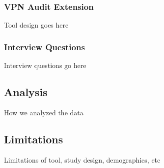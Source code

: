 \subsubsection{VPN Audit Extension}
Tool design goes here

\subsubsection{Interview Questions}
Interview questions go here

\subsection{Analysis} 
How we analyzed the data

\subsection{Limitations}
Limitations of tool, study design, demographics, etc
